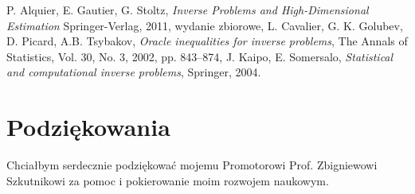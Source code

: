\documentclass[a0,portrait]{a0poster}
\begin{document}
\begin{multicols}{2}
\begin{thebibliography}{5}
 P. Alquier,	E. Gautier, G. Stoltz, \emph{Inverse Problems and High-Dimensional Estimation}	Springer-Verlag, 2011, wydanie zbiorowe,
 L. Cavalier, G. K. Golubev, D. Picard, A.B. Tsybakov, \emph{Oracle inequalities for inverse problems}, The Annals of Statistics, Vol. 30, No. 3, 2002, pp. 843–874,	
J. Kaipo, E. Somersalo, \emph{Statistical and computational inverse problems}, Springer, 2004.
\end{thebibliography}


\section*{Podziękowania}
Chciałbym serdecznie podziękować mojemu Promotorowi Prof. Zbigniewowi Szkutnikowi za pomoc i pokierowanie moim rozwojem naukowym.

\end{multicols}
\end{document}
